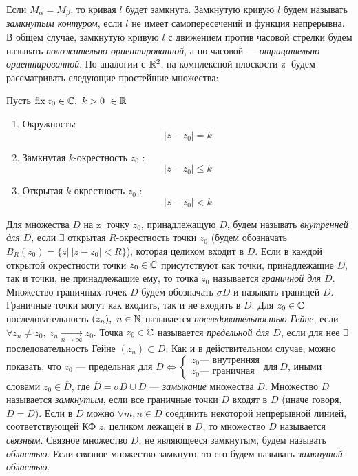 \documentclass[../../main.tex]{subfiles}
\begin{document}
Если  $M_{\alpha} = M_{\beta}$, то кривая $l$ будет замкнута. 
Замкнутую кривую  $l$ будем называть \emph{замкнутым контуром},
если $l$ не имеет самопересечений и функция непрерывна. В общем
случае, замкнутую кривую  $l$ с движением против часовой стрелки
будем называть \emph{положительно ориентированной}, 
а по часовой ---
\emph{отрицательно ориентированной}. По аналогии  с $\mathbb{R}^2$,
 на комплексной плоскости  \textcircled{z} будем рассматривать 
следующие  простейшие множества:

Пусть $\operatorname{fix}{z_0}\in \mathbb{C},\   k>0\ \in \mathbb{R}$
\begin{enumerate}
\item Окружность: \[  |z - z_0| = k\] 
\item Замкнутая $k$-окрестность $z_0$ : \[ |z - z_0| \leq k\] 
\item Открытая $k$-окрестность $z_0$ : \[ |z - z_0| < k\] 
\end{enumerate}

Для множества $D$ на \textcircled{z} точку $z_0$, принадлежащую  $D$, 
будем называть \emph{внутренней для  $D$}, если $\exists$ открытая 
$R$-окрестность точки $z_0$ (будем обозначать 
$B_R(z_0) = \{ z |\  |z - z_0| < R \}$), которая целиком входит в  $D$.
Если в каждой открытой окрестности точки 
$z_0 \in \mathbb{C}$ присутствуют как точки, принадлежащие $D$, 
так и точки, не принадлежащие ему, то точка $z_0$ называется \emph{граничной для
$D$}.
Множество граничных точек $D$ будем обозначать $\sigma\!{D}$ и называть границей
$D$.
Граничные точки могут как входить, так и не входить в $D$. Для $z_0 \in \mathbb{C}$
последовательность
$(z_n),\ n\in\mathbb{N}$ называется \emph{последовательностью Гейне}, если $\forall
z_n\neq z_0, \ z_n \underset{n \longrightarrow \infty}{\longrightarrow} z_0 $.
 Точка $z_0 \in \mathbb{C}$ называется \emph{предельной для $D$},
если для нее $\exists$ последовательность Гейне $(z_n) \subset D$. Как и в
действительном случае, можно показать,
 что $z_0$ --- предельная для $D \iff
  \begin{cases} 
  z_0 \text{--- внутренняя} \\
  z_0 \text{--- граничная}
\end{cases} \text{для}\ D$, иными словами $z_0 \in \overline{D}$, где
$\overline{D} = \sigma\!{D}\cup D$ --- \emph{замыкание} множества $D$.
 Множество $D$ называется \emph{замкнутым}, если все граничные точки $D$
 входят в $D$ (иначе говоря, $D = \overline{D}$). 
 Если в $D$ можно $\forall m, n \in D$ соединить некоторой непрерывной линией, соответствующей
 КФ $z$, целиком лежащей в $D$, то множество $D$ называется  \emph{связным}.
 Связное множество $D$, не являющееся замкнутым, будем называть \emph{областью}. 
 Если связное множество замкнуто, то его будем называть \emph{замкнутой областью}.
 
\end{document}
